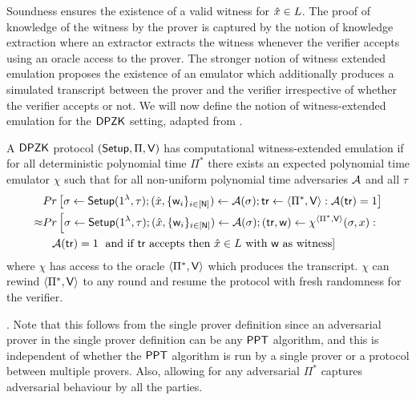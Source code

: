 Soundness ensures the existence of a valid witness for $\hat{x} \in L$. The proof of knowledge of the witness by the prover is captured by the notion of knowledge extraction where an extractor extracts the witness whenever the verifier accepts using an oracle access to the prover. The stronger notion of witness extended emulation \cite{Lindell03} proposes the existence of an emulator which additionally produces a simulated transcript between the prover and the verifier irrespective of whether the verifier accepts or not. We will now define the notion of witness-extended emulation for the $\mathsf{DPZK}$ setting, adapted from \cite{Groth11}. 
\begin{definition}

A $\mathsf{DPZK}$ protocol $(\mathsf{Setup}, \Pi, \mathsf{V})$ has computational witness-extended emulation if for all deterministic polynomial time $\Pi^*$ there exists an expected polynomial time emulator $\chi$ such that for all non-uniform polynomial time adversaries $\mathcal{A}$ and all $\tau$
\begin{align*}
&Pr \left[\sigma \leftarrow \mathsf{Setup}(1^{\lambda}, \tau); (\hat{x}, \{\mathsf{w}_i\}_{i \in [\mathsf{N}]}) \leftarrow \mathcal{A}(\sigma); \mathsf{tr} \leftarrow \langle \Pi^*, \mathsf{V} \rangle: \mathcal{A}(\mathsf{tr}) = 1 \right] \\
\approx &Pr \left[\sigma \leftarrow \mathsf{Setup}(1^{\lambda}, \tau); (\hat{x}, \{\mathsf{w}_i\}_{i \in [\mathsf{N}]}) \leftarrow \mathcal{A}(\sigma); (\mathsf{tr}, \mathsf{w}) \leftarrow \chi^{\langle \Pi^*, \mathsf{V} \rangle}(\sigma, x): \right. \\
&\;\;\; \mathcal{A}(\mathsf{tr}) = 1 \left. \text{ and if } \mathsf{tr} \text{ accepts then } \hat{x} \in L \text{ with } \mathsf{w} \text{ as witness} \right] 
\end{align*}
where $\chi$ has access to the oracle $\langle \Pi^*, \mathsf{V} \rangle$ which produces the transcript. $\chi$ can rewind $\langle \Pi^*, \mathsf{V} \rangle$ to any round and resume the protocol with fresh randomness for the verifier.
\end{definition}
.
Note that this follows from the single prover definition since an adversarial prover in the single prover definition can be any $\mathsf{PPT}$ algorithm, and this is independent of whether the $\mathsf{PPT}$ algorithm is run by a single prover or a protocol between multiple provers.
Also, allowing for any adversarial $\Pi^*$ captures adversarial behaviour by all the parties.

